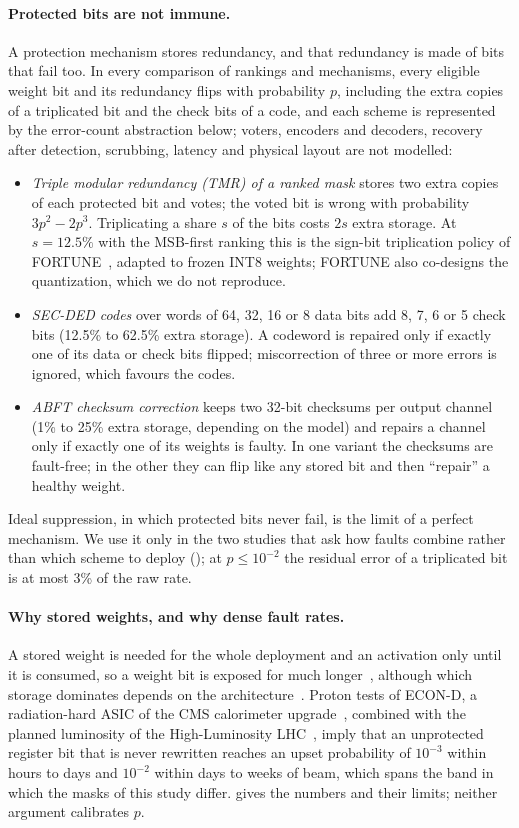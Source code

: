 \paragraph{Protected bits are not immune.} A protection mechanism stores redundancy, and that redundancy is made of bits that fail too. In every comparison of rankings and mechanisms, every eligible weight bit and its redundancy flips with probability $p$, including the extra copies of a triplicated bit and the check bits of a code, and each scheme is represented by the error-count abstraction below; voters, encoders and decoders, recovery after detection, scrubbing, latency and physical layout are not modelled:
\begin{itemize}
\item \emph{Triple modular redundancy (TMR) of a ranked mask} stores two extra copies of each protected bit and votes; the voted bit is wrong with probability $3p^2-2p^3$. Triplicating a share $s$ of the bits costs $2s$ extra storage. At $s=12.5\%$ with the MSB-first ranking this is the sign-bit triplication policy of FORTUNE~\cite{nazari2024fortune}, adapted to frozen INT8 weights; FORTUNE also co-designs the quantization, which we do not reproduce.
\item \emph{SEC-DED codes} over words of 64, 32, 16 or 8 data bits add 8, 7, 6 or 5 check bits (12.5\% to 62.5\% extra storage). A codeword is repaired only if exactly one of its data or check bits flipped; miscorrection of three or more errors is ignored, which favours the codes.
\item \emph{ABFT checksum correction} keeps two 32-bit checksums per output channel (1\% to 25\% extra storage, depending on the model) and repairs a channel only if exactly one of its weights is faulty. In one variant the checksums are fault-free; in the other they can flip like any stored bit and then ``repair'' a healthy weight.
\end{itemize}
Ideal suppression, in which protected bits never fail, is the limit of a perfect mechanism. We use it only in the two studies that ask how faults combine rather than which scheme to deploy (); at $p\le10^{-2}$ the residual error of a triplicated bit is at most 3\% of the raw rate.

\paragraph{Why stored weights, and why dense fault rates.} A stored weight is needed for the whole deployment and an activation only until it is consumed, so a weight bit is exposed for much longer~\cite{mukherjee2003avf,li2017understanding}, although which storage dominates depends on the architecture~\cite{tyagi2023thales}. Proton tests of ECON-D, a radiation-hard ASIC of the CMS calorimeter upgrade~\cite{cummings2023econd}, combined with the planned luminosity of the High-Luminosity LHC~\cite{hllhc2017tdr}, imply that an unprotected register bit that is never rewritten reaches an upset probability of $10^{-3}$ within hours to days and $10^{-2}$ within days to weeks of beam, which spans the band in which the masks of this study differ.  gives the numbers and their limits; neither argument calibrates $p$.

